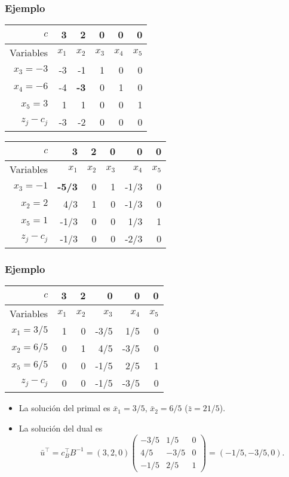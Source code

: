 \documentclass{beamer}
\begin{document}
\begin{frame}
\frametitle{Ejemplo}

\begin{center}
\begin{tabular}{r | rrrrr}
$c$ & 3 & 2 & 0 & 0 & 0 \\ \hline
Variables & $x_1$ & $x_2$ & $x_3$ & $x_4$ & $x_5$ \\ \hline
$x_3 = -3$ & -3 & -1 & 1 & 0 & 0 \\
$x_4=  -6$   & -4 & \textbf{-3} & 0 & 1 & 0  \\
$x_5=3$ & 1 & 1 & 0 & 0 & 1 \\ \hline
$z_j-c_j$ & -3 & -2 & 0 & 0 & 0 
\end{tabular}
\end{center}


\begin{center}
\begin{tabular}{r | rrrrr}
$c$ & 3 & 2 & 0 & 0 & 0 \\ \hline
Variables & $x_1$ & $x_2$ & $x_3$ & $x_4$ & $x_5$ \\ \hline
$x_3 = -1$ & \textbf{-5/3} & 0 & 1 & -1/3 & 0 \\
$x_2=  2$   & 4/3 & 1 & 0 & -1/3 & 0  \\
$x_5=1$ & -1/3 & 0 & 0 & 1/3 & 1 \\ \hline
$z_j-c_j$ & -1/3 & 0 & 0 & -2/3 & 0 
\end{tabular}
\end{center}


\end{frame}
\begin{frame}
\frametitle{Ejemplo}


\begin{center}
\begin{tabular}{r | rrrrr}
$c$ & 3 & 2 & 0 & 0 & 0 \\ \hline
Variables & $x_1$ & $x_2$ & $x_3$ & $x_4$ & $x_5$ \\ \hline
$x_1 = 3/5$ & 1 & 0 & -3/5 & 1/5 & 0 \\
$x_2=  6/5$   & 0 & 1 & 4/5 & -3/5 & 0  \\
$x_5=6/5$ & 0 & 0 & -1/5 & 2/5 & 1 \\ \hline
$z_j-c_j$ & 0 & 0 & -1/5 & -3/5 & 0 
\end{tabular}
\end{center}

\begin{itemize}
\item La solución del primal es $\bar{x}_1=3/5$, $\bar{x}_2=6/5$ ($\bar{z}=21/5$).
\item La solución del dual es 
\[
\bar{u}^\top = c_B^\top B^{-1} = (3,2,0)\begin{pmatrix}
-3/5 & 1/5 & 0 \\ 
4/5 & -3/5 & 0 \\ 
-1/5 & 2/5 & 1
\end{pmatrix} = (-1/5,-3/5,0).
\]
\end{itemize}



\end{frame}
\end{document}
